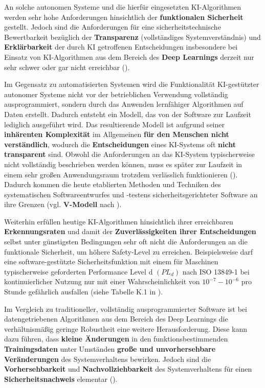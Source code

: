 \documentclass [oneside,10pt,a4paper,ngerman,BCOR10mm,headsepline,parindent,final]{scrartcl}
\begin{document}
An solche autonomen Systeme und die hierfür eingesetzten KI-Algorithmen
werden sehr hohe Anforderungen hinsichtlich der \textbf{funktionalen
Sicherheit} gestellt. Jedoch sind die Anforderungen für eine
sicherheitstechnische Bewertbarkeit bezüglich der \textbf{Transparenz}
(vollständiges Systemverständnis) und \textbf{Erklärbarkeit} der durch
KI getroffenen Entscheidungen insbesondere bei Einsatz von
KI-Algorithmen aus dem Bereich des \textbf{Deep Learnings} derzeit nur
sehr schwer oder gar nicht erreichbar (\cite{Liggesmeyer_2019}).

Im Gegensatz zu automatisierten Systemen wird die Funktionalität
KI-gestützter autonomer Systeme nicht vor der betrieblichen Verwendung
vollständig ausprogrammiert, sondern durch das Anwenden lernfähiger
Algorithmen auf Daten erstellt. Dadurch entsteht ein Modell, das von der
Software zur Laufzeit lediglich ausgeführt wird. Das resultierende
Modell ist aufgrund seiner \textbf{inhärenten Komplexität} im
Allgemeinen \textbf{für den Menschen nicht verständlich}, wodurch die
\textbf{Entscheidungen} eines KI-Systems oft \textbf{nicht transparent}
sind. Obwohl die Anforderungen an das KI-System typischerweise nicht
vollständig beschrieben werden können, muss es später zur Laufzeit in
einem sehr großen Anwendungsraum trotzdem verlässlich funktionieren
(\cite{Schneider_2021}). Dadurch kommen die heute etablierten Methoden
und Techniken des systematischen Softwareentwurfes und -testens
sicherheitsgerichteter Software an ihre Grenzen (vgl. \textbf{V-Modell}
nach \cite{DIN_EN_61508-3_2011-02}).

Weiterhin erfüllen heutige KI-Algorithmen hinsichtlich ihrer
erreichbaren \textbf{Erkennungsraten} und damit der
\textbf{Zuverlässigkeiten ihrer Entscheidungen} selbst unter günstigsten
Bedingungen sehr oft nicht die Anforderungen an die funktionale
Sicherheit, um höhere Safety-Level zu erreichen. Beispielsweise darf
eine software-gestützte Sicherheitsfunktion mit einem für Maschinen
typischerweise geforderten Performance Level d \((PL_{d})\) nach ISO
13849-1 bei kontinuierlicher Nutzung nur mit einer Wahrscheinlichkeit
von \(10^{-7} - 10^{-6}\) pro Stunde gefährlich ausfallen (siehe Tabelle
K.1 in \cite{DIN_EN_ISO_13849-1_2016}).

Im Vergleich zu traditioneller, vollständig ausprogrammierter Software
ist bei datengetriebenen Algorithmen aus dem Bereich des Deep Learnings
die verhältnismäßig geringe Robustheit eine weitere Herausforderung.
Diese kann dazu führen, dass \textbf{kleine Änderungen} in den
funktionsbestimmenden \textbf{Trainingsdaten} unter Umständen
\textbf{große und unvorhersehbare Veränderungen} des Systemverhaltens
bewirken. Jedoch sind die \textbf{Vorhersehbarkeit} und
\textbf{Nachvollziehbarkeit} des Systemverhaltens für einen
\textbf{Sicherheitsnachweis} elementar
(\cite{BAuA_Rechtsgutachten_KI_2021}).
\end{document}

